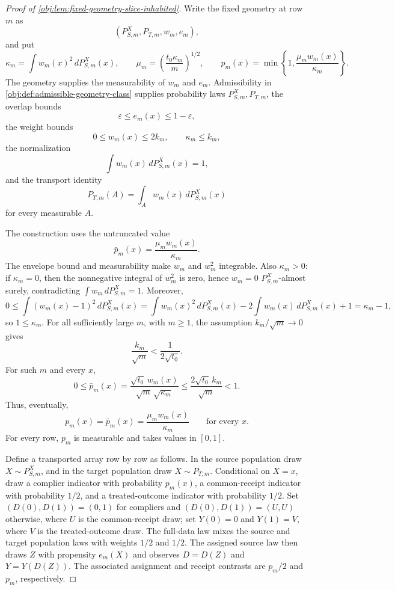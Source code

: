 \documentclass[11pt]{article}
\begin{document}
\begin{proof}[Proof of \cref{obj:lem:fixed-geometry-slice-inhabited}]
Write the fixed geometry at row \(m\) as
\[
(P_{S,m}^X,P_{T,m},w_m,e_m),
\]
and put
\[
\kappa_m=\int w_m(x)^2\,dP_{S,m}^X(x),
\qquad
\mu_m=\left(\frac{t_0\kappa_m}{m}\right)^{1/2},
\qquad
p_m(x)=\min\left\{1,\frac{\mu_m w_m(x)}{\kappa_m}\right\}.
\]
The geometry supplies the measurability of \(w_m\) and \(e_m\). Admissibility in \cref{obj:def:admissible-geometry-class} supplies probability laws \(P_{S,m}^X,P_{T,m}\), the overlap bounds
\[
\varepsilon\le e_m(x)\le1-\varepsilon,
\]
the weight bounds
\[
0\le w_m(x)\le2k_m,
\qquad
\kappa_m\le k_m,
\]
the normalization
\[
\int w_m(x)\,dP_{S,m}^X(x)=1,
\]
and the transport identity
\[
P_{T,m}(A)=\int_A w_m(x)\,dP_{S,m}^X(x)
\]
for every measurable \(A\). %

The construction uses the untruncated value
\[
\bar p_m(x)=\frac{\mu_m w_m(x)}{\kappa_m}.
\]
The envelope bound and measurability make \(w_m\) and \(w_m^2\) integrable. Also \(\kappa_m>0\): if \(\kappa_m=0\), then the nonnegative integral of \(w_m^2\) is zero, hence \(w_m=0\) \(P_{S,m}^X\)-almost surely, contradicting \(\int w_m\,dP_{S,m}^X=1\). Moreover,
\[
0\le \int (w_m(x)-1)^2\,dP_{S,m}^X(x)
=\int w_m(x)^2\,dP_{S,m}^X(x)-2\int w_m(x)\,dP_{S,m}^X(x)+1
=\kappa_m-1,
\]
so \(1\le\kappa_m\). For all sufficiently large \(m\), with \(m\ge1\), the assumption \(k_m/\sqrt m\to0\) gives
\[
\frac{k_m}{\sqrt m}<\frac{1}{2\sqrt{t_0}}.
\]
For such \(m\) and every \(x\),
\[
0\le \bar p_m(x)
=\frac{\sqrt{t_0}\,w_m(x)}{\sqrt m\,\sqrt{\kappa_m}}
\le
\frac{2\sqrt{t_0}\,k_m}{\sqrt m}
<1.
\]
Thus, eventually,
\[
p_m(x)=\bar p_m(x)=\frac{\mu_m w_m(x)}{\kappa_m}
\qquad\text{for every }x.
\]
For every row, \(p_m\) is measurable and takes values in \([0,1]\). %

Define a transported array row by row as follows. In the source population draw \(X\sim P_{S,m}^X\), and in the target population draw \(X\sim P_{T,m}\). Conditional on \(X=x\), draw a complier indicator with probability \(p_m(x)\), a common-receipt indicator with probability \(1/2\), and a treated-outcome indicator with probability \(1/2\). Set \((D(0),D(1))=(0,1)\) for compliers and \((D(0),D(1))=(U,U)\) otherwise, where \(U\) is the common-receipt draw; set \(Y(0)=0\) and \(Y(1)=V\), where \(V\) is the treated-outcome draw. The full-data law mixes the source and target population laws with weights \(1/2\) and \(1/2\). The assigned source law then draws \(Z\) with propensity \(e_m(X)\) and observes \(D=D(Z)\) and \(Y=Y(D(Z))\). The associated assignment and receipt contrasts are \(p_m/2\) and \(p_m\), respectively.


\end{proof}
\end{document}
